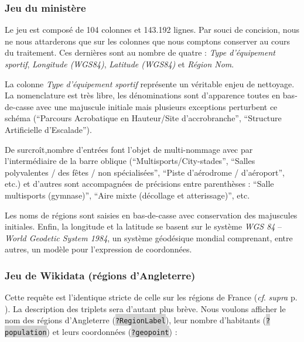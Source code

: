 \documentclass[hidelinks, 12pt]{article}
\newcommand{\code}[1]{\colorbox{LightGray}{\texttt{#1}}}
\begin{document}
%





\subsubsection{Jeu du ministère}

Le jeu est composé de 104 colonnes et 143.192 lignes. Par souci de concision, nous ne nous attarderons que sur les colonnes que nous comptons conserver au cours du traitement. Ces dernières sont au nombre de quatre : \textit{Type d'équipement sportif}, \textit{Longitude (WGS84)}, \textit{Latitude (WGS84)} et \textit{Région Nom}.

La colonne \textit{Type d'équipement sportif} représente un véritable enjeu de nettoyage. La nomenclature est très libre, les dénominations sont d'apparence toutes en bas-de-casse avec une majuscule initiale mais plusieurs exceptions perturbent ce schéma (\enquote{Parcours Acrobatique en Hauteur/Site d'accrobranche}, \enquote{Structure Artificielle d'Escalade}).

De surcroît,nombre d'entrées font l'objet de multi-nommage avec par l'intermédiaire de la barre oblique (\enquote{Multisports/City-stades}, \enquote{Salles polyvalentes / des fêtes / non spécialisées}, \enquote{Piste d’aérodrome / d'aéroport}, etc.) et d'autres sont accompagnées de précisions entre parenthèses : \enquote{Salle multisports (gymnase)}, \enquote{Aire mixte (décollage et atterissage)}, etc.

Les noms de régions sont saisies en bas-de-casse avec conservation des majuscules initiales. Enfin, la longitude et la latitude se basent sur le système \textit{WGS 84} -- \textit{World Geodetic System 1984}, un système géodésique mondial comprenant, entre autres, un modèle pour l'expression de coordonnées.





%





\subsubsection{Jeu de Wikidata (régions d'Angleterre)}

Cette requête est l'identique stricte de celle sur les régions de France (\textit{cf}. \textit{supra} p. \pageref{queryfr}). La description des triplets sera d'autant plus brève. Nous voulons afficher le nom des régions d'Angleterre (\code{?RegionLabel}), leur nombre d'habitants (\code{?population}) et leurs coordonnées (\code{?geopoint}) :
\end{document}
